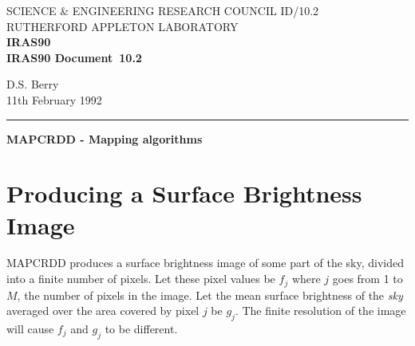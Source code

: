 \pagestyle{myheadings}

\newcommand{\irasdoccategory}  {IRAS90 Document}
\newcommand{\irasdocinitials}  {ID}
\newcommand{\irasdocnumber}    {10.2}
\newcommand{\irasdocauthors}   {D.S. Berry}
\newcommand{\irasdocdate}      {11th February 1992}
\newcommand{\irasdoctitle}     {MAPCRDD -  Mapping algorithms}

\newcommand{\irasdocname}{\irasdocinitials /\irasdocnumber}
\renewcommand{\_}{{\tt\char'137}}     %
\markright{\irasdocname}
\setlength{\textwidth}{160mm}
\setlength{\textheight}{240mm}
\setlength{\topmargin}{-5mm}
\setlength{\oddsidemargin}{0mm}
\setlength{\evensidemargin}{0mm}
\setlength{\parindent}{0mm}
\setlength{\parskip}{\medskipamount}
\setlength{\unitlength}{1mm}



\thispagestyle{empty}
SCIENCE \& ENGINEERING RESEARCH COUNCIL \hfill \irasdocname\\
RUTHERFORD APPLETON LABORATORY\\
{\large\bf IRAS90\\}
{\large\bf \irasdoccategory\ \irasdocnumber}
\begin{flushright}
\irasdocauthors\\
\irasdocdate
\end{flushright}
\vspace{-4mm}
\rule{\textwidth}{0.5mm}
\vspace{5mm}
\begin{center}
{\Large\bf \irasdoctitle}
\end{center}
\vspace{5mm}
\setlength{\parskip}{0mm}
\tableofcontents
\setlength{\parskip}{\medskipamount}
\markright{\irasdocname}

\section{Producing a Surface Brightness Image}
MAPCRDD produces a surface brightness image of some part of the sky, divided
into a finite number of pixels. Let these pixel values be $f_{j}$ where $j$ goes
from 1 to $M$, the number of pixels in the image. Let the mean surface
brightness of the {\em sky} averaged over the area covered by pixel $j$ be
$g_{j}$. The finite resolution of the image will cause $f_{j}$ and $g_{j}$ to be
different.


